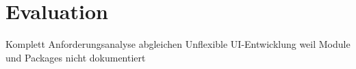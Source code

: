 \section{Evaluation}

Komplett Anforderungsanalyse abgleichen
Unflexible UI-Entwicklung weil Module und Packages nicht dokumentiert

\newpage

